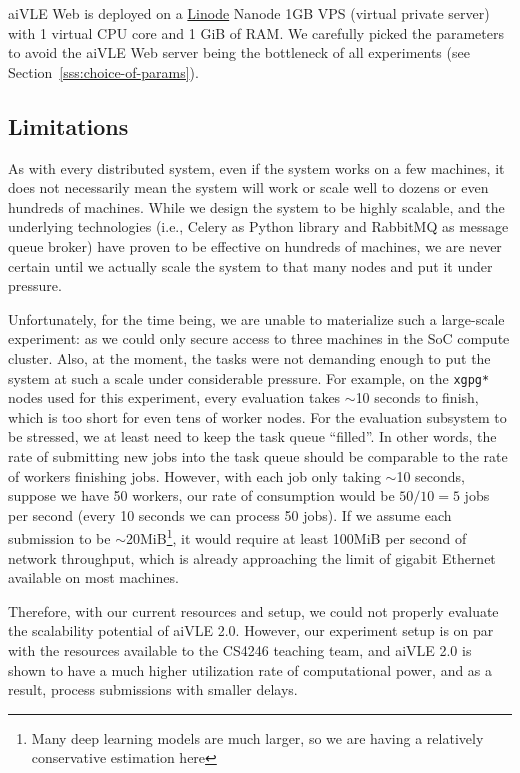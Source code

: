 aiVLE Web is deployed on a \href{https://linode.com/}{Linode} Nanode 1GB VPS (virtual private server) with 1 virtual CPU core and 1 GiB of RAM. We carefully picked the parameters to avoid the aiVLE Web server being the bottleneck of all experiments (see Section~\ref{sss:choice-of-params}).

\subsection{Limitations}
\label{ss:deployment-limitations}
As with every distributed system, even if the system works on a few machines, it does not necessarily mean the system will work or scale well to dozens or even hundreds of machines. While we design the system to be highly scalable, and the underlying technologies (i.e., Celery as Python library and RabbitMQ as message queue broker) have proven to be effective on hundreds of machines, we are never certain until we actually scale the system to that many nodes and put it under pressure.

Unfortunately, for the time being, we are unable to materialize such a large-scale experiment: as we could only secure access to three machines in the SoC compute cluster. Also, at the moment, the tasks were not demanding enough to put the system at such a scale under considerable pressure. For example, on the \texttt{xgpg*} nodes used for this experiment, every evaluation takes $\sim$10 seconds to finish, which is too short for even tens of worker nodes. For the evaluation subsystem to be stressed, we at least need to keep the task queue ``filled''. In other words, the rate of submitting new jobs into the task queue should be comparable to the rate of workers finishing jobs. However, with each job only taking $\sim$10 seconds, suppose we have 50 workers, our rate of consumption would be $50/10=5$ jobs per second (every 10 seconds we can process 50 jobs). If we assume each submission to be $\sim$20MiB\footnote{Many deep learning models are much larger, so we are having a relatively conservative estimation here}, it would require at least 100MiB per second of network throughput, which is already approaching the limit of gigabit Ethernet available on most machines.

Therefore, with our current resources and setup, we could not properly evaluate the scalability potential of aiVLE 2.0. However, our experiment setup is on par with the resources available to the CS4246 teaching team, and aiVLE 2.0 is shown to have a much higher utilization rate of computational power, and as a result, process submissions with smaller delays.

